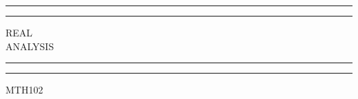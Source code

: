 \documentclass{notes}
\begin{document}
	\begin{titlepage} %
		
		\centering %
		
		\scshape %
		
		\vspace*{\baselineskip} %
		
		
		\rule{\textwidth}{1.6pt}\vspace*{-\baselineskip}\vspace*{2pt} %
		\rule{\textwidth}{0.4pt} %
		
		\vspace{0.75\baselineskip} %
		
		{\huge REAL\\ ANALYSIS\\} %
		
		\vspace{0.75\baselineskip} %
		
		\rule{\textwidth}{0.4pt}\vspace*{-\baselineskip}\vspace{3.2pt} %
		\rule{\textwidth}{1.6pt} %
		
		\vspace{2\baselineskip} %
		
		
		\LARGE{MTH102~\nocite{abb01understanding}\nocite{introduction}\nocite{wiki}} 
		
		\vspace*{3\baselineskip} %
		
		
		
		
		

\end{titlepage}
\end{document}
